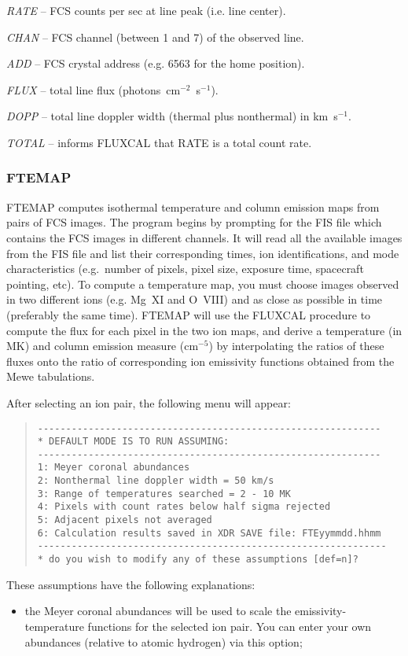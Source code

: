 {{{ {\it RATE} -- FCS counts per sec at line peak (i.e. line center).

 {\it CHAN} -- FCS channel (between 1 and 7) of the observed line.

 {\it ADD} -- FCS crystal address (e.g. 6563 for the home position).


{\it FLUX} -- total line flux (photons~cm$^{-2}$~s$^{-1}$).


{\it DOPP} --  total line doppler width (thermal plus nonthermal) in km~s$^{-1}$.

{\it TOTAL} -- informs FLUXCAL that RATE is a total count rate.

\subsubsection{FTEMAP}

FTEMAP computes isothermal temperature and  column emission maps from pairs
of FCS images. The program begins by  prompting for the FIS file which
contains the FCS images in different channels. It will read all the available
images from the FIS file and list their corresponding times, ion
identifications, and mode characteristics (e.g.\ number of pixels, pixel size,
exposure time, spacecraft pointing, etc). To compute a temperature map, you
must choose  images observed in two different ions (e.g. Mg~XI and O~VIII) and
as close as possible in time (preferably the same time). FTEMAP will use the
FLUXCAL procedure to compute the flux for each pixel in the two ion maps, and
derive a temperature (in MK) and column emission measure (cm$^{-5}$) by 
interpolating the ratios of these fluxes onto the ratio of corresponding ion
emissivity functions obtained from the Mewe tabulations.

After selecting an ion pair, the following menu will appear:
\begin{quote}
\begin{verbatim}
-------------------------------------------------------------
* DEFAULT MODE IS TO RUN ASSUMING:
-------------------------------------------------------------
1: Meyer coronal abundances
2: Nonthermal line doppler width = 50 km/s
3: Range of temperatures searched = 2 - 10 MK
4: Pixels with count rates below half sigma rejected
5: Adjacent pixels not averaged
6: Calculation results saved in XDR SAVE file: FTEyymmdd.hhmm
--------------------------------------------------------------
* do you wish to modify any of these assumptions [def=n]?
\end{verbatim}
\end{quote}
These assumptions have the following explanations:
\begin{itemize}
\item the Meyer coronal abundances will be used to scale the
emissivity-temperature functions for the selected ion pair. You can enter your
own abundances (relative to atomic hydrogen) via this option;


\end{itemize}}}}
